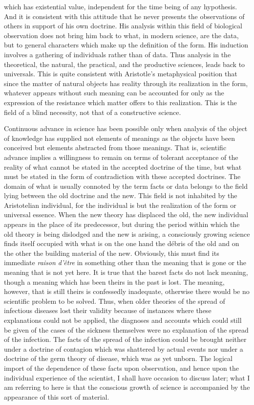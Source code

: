 \documentclass[12pt]{article}
\begin{document}
which has existential value, independent for the
time being of any hypothesis. And it is consistent
with this attitude that he never presents the observations
of others in support of his own doctrine. His
analysis within this field of biological observation does
not bring him back to what, in modern science, are the
data, but to general characters which make up the
definition of the form. His induction involves a gathering
of individuals rather than of data. Thus analysis
in the theoretical, the natural, the practical,
and the productive sciences, leads back to universals.
This is quite consistent with Aristotle's metaphysical
position that since the matter of natural objects has
reality through its realization in the form, whatever
appears without such meaning can be accounted for
only as the expression of the resistance which matter
offers to this realization. This is the field of a blind
necessity, not that of a constructive science.


Continuous advance in science has been possible
only when analysis of the object of knowledge has supplied
not elements of meanings as the objects have
been conceived but elements abstracted from those
meanings. That is, scientific advance implies a willingness
to remain on terms of tolerant acceptance of
the reality of what cannot be stated in the accepted
doctrine of the time, but what must be stated in the
form of contradiction with these accepted doctrines.
The domain of what is usually connoted by the term
facts or data belongs to the field lying between the old
doctrine and the new. This field is not inhabited by
the Aristotelian individual, for the individual is but
the realization of the form or universal essence. When
the new theory has displaced the old, the new individual
appears in the place of its predecessor, but
during the period within which the old theory is being
dislodged and the new is arising, a consciously growing
science finds itself occupied with what is on the one
hand the débris of the old and on the other the building
material of the new. Obviously, this must find its immediate
\emph{raison d'\^{e}tre} in something other than the
meaning that is gone or the meaning that is not yet
here. It is true that the barest facts do not lack
meaning, though a meaning which has been theirs in
the past is lost. The meaning, however, that is still
theirs is confessedly inadequate, otherwise there would
be no scientific problem to be solved. Thus, when
older theories of the spread of infectious diseases lost
their validity because of instances where these explanations
could not be applied, the diagnoses and accounts
which could still be given of the cases of the
sickness themselves were no explanation of the spread
of the infection. The facts of the spread of the infection
could be brought neither under a doctrine of
contagion which was shattered by actual events nor
under a doctrine of the germ theory of disease, which
was as yet unborn. The logical import of the dependence
of these facts upon observation, and hence
upon the individual experience of the scientist, I shall
have occasion to discuss later; what I am referring to
here is that the conscious growth of science is accompanied
by the appearance of this sort of material.
\end{document}
